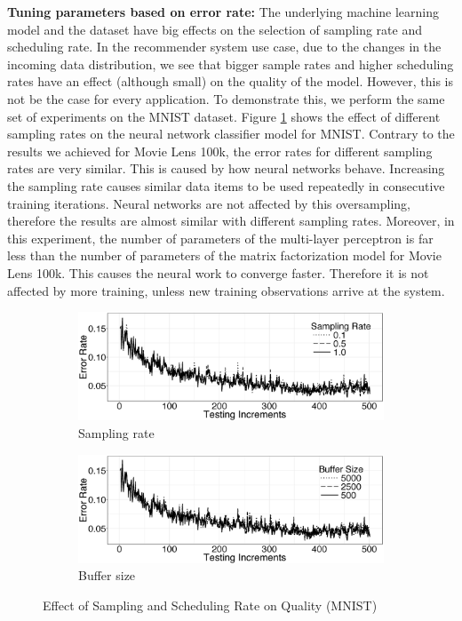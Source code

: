 \documentclass[10pt,conference,letterpaper]{IEEEtran}
\begin{document}
\textbf{Tuning parameters based on error rate:} The underlying machine learning model and the dataset have big effects on the selection of sampling rate and scheduling rate.
In the recommender system use case, due to the changes in the incoming data distribution, we see that bigger sample rates and higher scheduling rates have an effect (although small) on the quality of the model.
However, this is not be the case for every application.
To demonstrate this, we perform the same set of experiments on the MNIST dataset.
Figure \ref{fig:mnist-sample-rate} shows the effect of different sampling rates on the neural network classifier model for MNIST.
Contrary to the results we achieved for Movie Lens 100k, the error rates for different sampling rates are very similar.
This is caused by how neural networks behave.
Increasing the sampling rate causes similar data items to be used repeatedly in consecutive training iterations.
Neural networks are not affected by this oversampling, therefore the results are almost similar with different sampling rates.
Moreover, in this experiment, the number of parameters of the multi-layer perceptron is far less than the number of parameters of the matrix factorization model for Movie Lens 100k.
This causes the neural work to converge faster.
Therefore it is not affected by more training, unless new training observations arrive at the system.

\begin{figure}[h]
\begin{subfigure}{\columnwidth}
\centering
\includegraphics[width=\columnwidth]{../images/experiment-results/mnist-sampling-improved.eps}
\caption{Sampling rate}
\label{fig:mnist-sample-rate}
\end{subfigure}
\begin{subfigure}{\columnwidth}
\centering
\includegraphics[width=\columnwidth]{../images/experiment-results/mnist-buffersize-improved.eps}
\caption{Buffer size}
\label{fig:mnist-buffer-size}
\end{subfigure}
\vspace{2mm}
\caption{Effect of Sampling and Scheduling Rate on Quality (MNIST)}
\end{figure}
\end{document}
